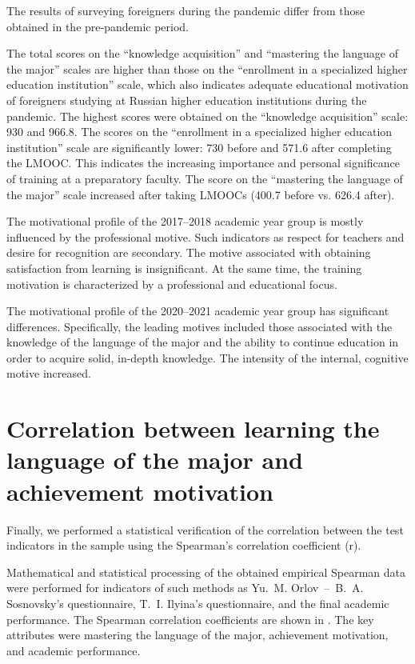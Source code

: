 \documentclass[english]{textolivre}
\begin{document}
The results of surveying foreigners during the pandemic differ from those obtained in the pre‑pandemic period.

The total scores on the “knowledge acquisition” and “mastering the language of the major” scales are higher than those on the “enrollment in a specialized higher education institution” scale, which also indicates adequate educational motivation of foreigners studying at Russian higher education institutions during the pandemic. The highest scores were obtained on the “knowledge acquisition” scale: 930 and 966.8. The scores on the “enrollment in a specialized higher education institution” scale are significantly lower: 730 before and 571.6 after completing the LMOOC. This indicates the increasing importance and personal significance of training at a preparatory faculty. The score on the “mastering the language of the major” scale increased after taking LMOOCs (400.7 before vs. 626.4 after).

The motivational profile of the 2017–2018 academic year group is mostly influenced by the professional motive. Such indicators as respect for teachers and desire for recognition are secondary. The motive associated with obtaining satisfaction from learning is insignificant. At the same time, the training motivation is characterized by a professional and educational focus.

The motivational profile of the 2020–2021 academic year group has significant differences. Specifically, the leading motives included those associated with the knowledge of the language of the major and the ability to continue education in order to acquire solid, in-depth knowledge. The intensity of the internal, cognitive motive increased.

\section{Correlation between learning the language of the major and achievement motivation}\label{sec-idioma}
Finally, we performed a statistical verification of the correlation between the test indicators in the sample using the Spearman’s correlation coefficient (r).

Mathematical and statistical processing of the obtained empirical Spearman data were performed for indicators of such methods as Yu. M. Orlov – B. A. Sosnovsky’s questionnaire, T. I. Ilyina’s questionnaire, and the final academic performance. The Spearman correlation coefficients are shown in . The key attributes were mastering the language of the major, achievement motivation, and academic performance.
\end{document}
